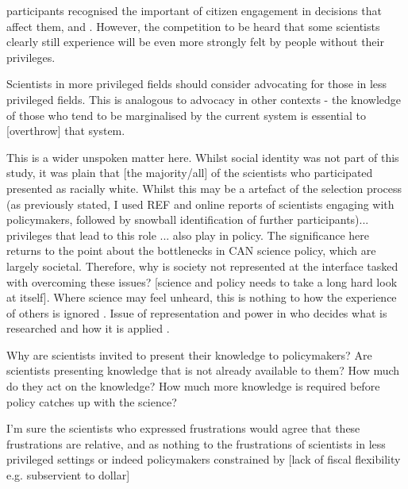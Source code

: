participants recognised the important of citizen engagement in decisions that affect them, and . However, the competition to be heard that some scientists clearly still experience will be even more strongly felt by people without their privileges.

Scientists in more privileged fields should consider advocating for those in less privileged fields. This is analogous to advocacy in other contexts - the knowledge of those who tend to be marginalised by the current system is essential to [overthrow] that system.

This is a wider unspoken matter here. Whilst social identity was not part of this study, it was plain that [the majority/all] of the scientists who participated presented as racially white. Whilst this may be a artefact of the selection process (as previously stated, I used REF and online reports of scientists engaging with policymakers, followed by snowball identification of further participants)... privileges that lead to this role ... also play in policy. The significance here returns to the point about the bottlenecks in CAN science policy, which are largely societal. Therefore, why is society not represented at the interface tasked with overcoming these issues? [science and policy needs to take a long hard look at itself]. Where science may feel unheard, this is nothing to how the experience of others is ignored \cite{IbarraJOBCIMRS2022}. Issue of representation and power in who decides what is researched and how it is applied \cite{McNiePS2017}.

Why are scientists invited to present their knowledge to policymakers? Are scientists presenting knowledge that is not already available to them? How much do they act on the knowledge? How much more knowledge is required before policy catches up with the science?

I'm sure the scientists who expressed frustrations would agree that these frustrations are relative, and as nothing to the frustrations of scientists in less privileged settings or indeed policymakers constrained by [lack of fiscal flexibility e.g. subservient to dollar]


